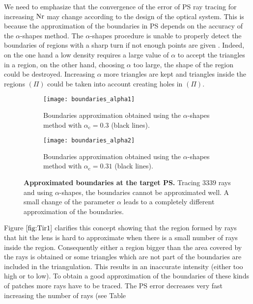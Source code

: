 We need to emphasize that the convergence of the error of PS ray tracing for increasing $\textrm{Nr}$ may change according to the design of the optical system.
This is because the approximation of the boundaries in PS depends on the accuracy of the $\alpha$-shapes method.
The $\alpha$-shapes procedure is unable to properly detect the boundaries of regions with a sharp turn if not enough points are given
\cite{teichmann1998surface}. Indeed, on the one hand a low density requires a large value of $\alpha$ to accept the triangles in a region, on the other hand,
 choosing $\alpha$ too large, the shape of the region could be destroyed. Increasing $\alpha$ more triangles are kept and triangles inside the regions $(\Pi)$ could be taken into account creating holes in $(\Pi)$.
\begin{figure}[t]
\centering
\begin{subfigure}{.48\textwidth}
  \centering
  \texttt{[image: boundaries\_alpha1]}
  \caption{Boundaries approximation obtained using the $\alpha$-shapes method with $\alpha_\textrm{c} = 0.3$ (black lines).}
\end{subfigure}
\hfill
\begin{subfigure}{.48\textwidth}
  \centering
  \texttt{[image: boundaries\_alpha2]}
  \caption{Boundaries approximation obtained using the $\alpha$-shapes method with $\alpha_\textrm{c} = 0.31$ (black lines).}
\end{subfigure}
\caption{\textbf{Approximated boundaries at the target PS.} Tracing $3339$ rays and using $\alpha$-shapes, the boundaries cannot be approximated well. 
A small change of the parameter $\alpha$ leads to a completely different approximation of the boundaries.}
\label{fig:Tir1}
\end{figure}
Figure $\ref{fig:Tir1}$ clarifies this concept showing that the region formed by rays that hit the lens is hard to approximate when there is a small number of rays inside the region. Consequently either a region bigger than the area covered by the rays is obtained or some triangles which are not part of the boundaries are included in the triangulation. This results in an inaccurate intensity (either too high or to low). To obtain a good approximation of the boundaries of these kinds of patches more rays have to be traced. The PS error decreases very fast increasing the number of rays (see Table
